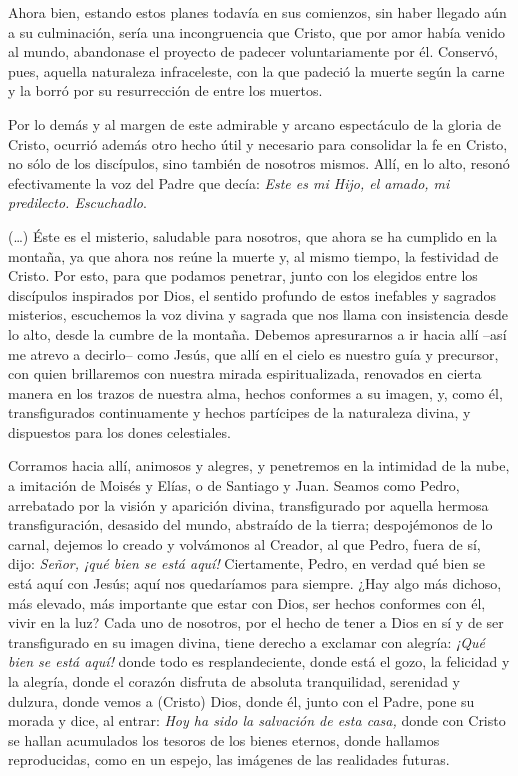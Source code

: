 \begin{body}
Ahora bien, estando estos planes todavía en sus comienzos, sin haber llegado aún a su culminación, sería una incongruencia que Cristo, que por amor había venido al mundo, abandonase el proyecto de padecer voluntariamente por él. Conservó, pues, aquella naturaleza infraceleste, con la que padeció la muerte según la carne y la borró por su resurrección de entre los muertos.

Por lo demás y al margen de este admirable y arcano espectáculo de la gloria de Cristo, ocurrió además otro hecho útil y necesario para consolidar la fe en Cristo, no sólo de los discípulos, sino también de nosotros mismos. Allí, en lo alto, resonó efectivamente la voz del Padre que decía: \textit{Este es mi Hijo, el amado, mi predilecto. Escuchadlo}.
\end{body}

\begin{patercite}(\ldots) Éste es el misterio, saludable para nosotros, que ahora se ha cumplido en la montaña, ya que ahora nos reúne la muerte y, al mismo tiempo, la festividad de Cristo. Por esto, para que podamos penetrar, junto con los elegidos entre los discípulos inspirados por Dios, el sentido profundo de estos inefables y sagrados misterios, escuchemos la voz divina y sagrada que nos llama con insistencia desde lo alto, desde la cumbre de la montaña. Debemos apresurarnos a ir hacia allí –así me atrevo a decirlo– como Jesús, que allí en el cielo es nuestro guía y precursor, con quien brillaremos con nuestra mirada espiritualizada, renovados en cierta manera en los trazos de nuestra alma, hechos conformes a su imagen, y, como él, transfigurados continuamente y hechos partícipes de la naturaleza divina, y dispuestos para los dones celestiales.

Corramos hacia allí, animosos y alegres, y penetremos en la intimidad de la nube, a imitación de Moisés y Elías, o de Santiago y Juan. Seamos como Pedro, arrebatado por la visión y aparición divina, transfigurado por aquella hermosa transfiguración, desasido del mundo, abstraído de la tierra; despojémonos de lo carnal, dejemos lo creado y volvámonos al Creador, al que Pedro, fuera de sí, dijo: \textit{Señor, ¡qué bien se está aquí!} Ciertamente, Pedro, en verdad qué bien se está aquí con Jesús; aquí nos quedaríamos para siempre. ¿Hay algo más dichoso, más elevado, más importante que estar con Dios, ser hechos conformes con él, vivir en la luz? Cada uno de nosotros, por el hecho de tener a Dios en sí y de ser transfigurado en su imagen divina, tiene derecho a exclamar con alegría: \textit{¡Qué bien se está aquí!} donde todo es resplandeciente, donde está el gozo, la felicidad y la alegría, donde el corazón disfruta de absoluta tranquilidad, serenidad y dulzura, donde vemos a (Cristo) Dios, donde él, junto con el Padre, pone su morada y dice, al entrar: \textit{Hoy ha sido la salvación de esta casa,} donde con Cristo se hallan acumulados los tesoros de los bienes eternos, donde hallamos reproducidas, como en un espejo, las imágenes de las realidades futuras.


\end{patercite}
